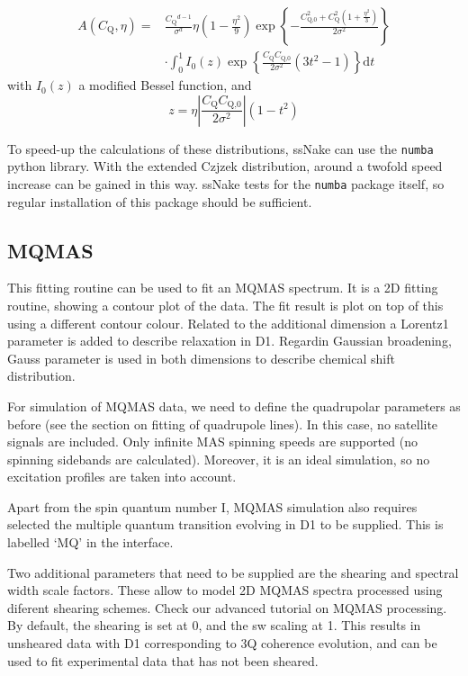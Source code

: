 \documentclass[11pt,a4paper]{article}
\begin{document}
\begin{align}
  A(C_\text{Q},\eta) = & \frac{C_\text{Q}{}^{d-1}}{\sigma^d} \eta \left(1 - \frac{\eta^2}{9} \right)
  \exp \left\{ - \frac{C_\text{Q,0}^2 + C_\text{Q}^2 (1 + \frac{\eta^2}{3})}{2\sigma^2} \right\}\\
  & \cdot \int_0^1 I_0(z) \exp \left\{ \frac{C_\text{Q}C_\text{Q,0}}{2\sigma^2} (3t^2 - 1)   \right\} \text{d}t
\end{align}
with $I_0(z)$ a modified Bessel function, and
\begin{equation}
  z = \eta \left| \frac{C_\text{Q}C_\text{Q,0}}{2\sigma^2}\right| (1 - t^2)
\end{equation}

To speed-up the calculations of these distributions, ssNake can use the \texttt{numba} python library. With
the extended Czjzek distribution, around a twofold speed increase can be gained in this way. ssNake
tests for the \texttt{numba} package itself, so regular installation of this package should be sufficient.




\subsection{MQMAS}
This fitting routine can be used to fit an MQMAS spectrum. It is a 2D fitting routine, showing a contour plot 
of the data. The fit result is plot on top of this using a different contour colour. Related to the additional dimension
a Lorentz1 parameter is added to describe relaxation in D1. Regardin Gaussian broadening, Gauss parameter is used in 
both dimensions to describe chemical shift distribution.

For simulation of MQMAS data, we need to define the quadrupolar parameters as before (see the section on fitting 
of quadrupole lines). In this case, no satellite signals are included. Only infinite MAS spinning speeds are
 supported (no spinning sidebands are calculated). Moreover, it is an ideal simulation, so no excitation profiles 
are taken into account.

Apart from the spin quantum number I, MQMAS simulation also requires selected the multiple quantum transition 
evolving in D1 to be supplied. This is labelled `MQ' in the interface. 

Two additional parameters that need to be supplied are the shearing and spectral width scale factors. These allow 
to model 2D MQMAS spectra processed using diferent shearing schemes. Check our advanced tutorial on MQMAS processing. 
By default, the shearing is set at 0, and the sw scaling at 1. This results in unsheared data with D1 corresponding 
to 3Q coherence evolution, and can be used to fit experimental data that has not been sheared.
\end{document}
